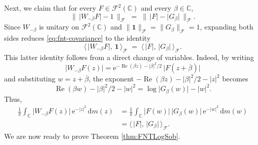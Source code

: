 \documentclass[11pt]{amsart}
\theoremstyle{remark}
\newcommand{\C}{\mathbb{C}}
\newcommand{\abs}[1]{\lvert #1 \rvert}
\newcommand{\norm}[1]{\lVert #1 \rVert}
\newcommand{\dd}{\mathrm{d}}
\newcommand{\ee}{\mathrm{e}}
\begin{document}
Next, we claim that for every $F \in \mathcal{F}^2(\C)$ and every
$\beta \in \C$,
\begin{equation}\label{eq:fnt-covariance}
\norm{\, \abs{W_{-\beta} F} - 1 \,}_{\mathcal{F}}
\;=\;
\norm{\, \abs{F} - \abs{G_\beta} \,}_{\mathcal{F}}.
\end{equation}
Since $W_{-\beta}$ is unitary on $\mathcal{F}^2(\C)$ and
$\norm{\mathbf{1}}_{\mathcal{F}} = \norm{G_\beta}_{\mathcal{F}} = 1$,
expanding both sides reduces \eqref{eq:fnt-covariance} to the identity
\[
\bigl\langle\, \abs{W_{-\beta} F},\, \mathbf{1} \,\bigr\rangle_{\mathcal{F}}
\;=\;
\bigl\langle\, \abs{F},\, \abs{G_\beta} \,\bigr\rangle_{\mathcal{F}}.
\]
This latter identity follows from a direct change of variables. Indeed, by writing $$\abs{W_{-\beta} F(z)}
= \ee^{-\operatorname{Re}(\beta z) - \abs{\beta}^2/2}\,
\abs{F(z + \overline{\beta})}$$ and substituting $w = z + \overline{\beta}$,
the exponent
$-\operatorname{Re}(\beta z) - \abs{\beta}^2/2 - \abs{z}^2$
becomes $$\operatorname{Re}(\beta w) - \abs{\beta}^2/2 - \abs{w}^2
= \log \abs{G_\beta(w)} - \abs{w}^2.$$ Thus,
\[
\begin{aligned}
\frac{1}{\pi}\int_{\C} \abs{W_{-\beta} F(z)}\,
\ee^{-\abs{z}^2}\,\dd m(z)
&=
\frac{1}{\pi}\int_{\C} \abs{F(w)}\,
\abs{G_\beta(w)}\, \ee^{-\abs{w}^2}\,\dd m(w)
\\
&=
\bigl\langle\, \abs{F},\, \abs{G_\beta} \,\bigr\rangle_{\mathcal{F}}.
\end{aligned}
\]
We are now ready to prove Theorem \ref{thm:FNTLogSob}. 
\end{document}
